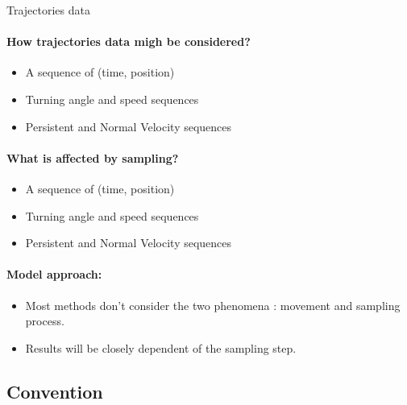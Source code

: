 \begin{frame}{Trajectories data}
\paragraph{How trajectories data migh be considered?}
\begin{itemize}
\item A sequence of (time, position)
\item Turning angle and speed sequences
\item Persistent and Normal Velocity sequences
\end{itemize}
\pause
\paragraph{What is affected by sampling?}
\begin{itemize}
\item A sequence of (time, position)
\item Turning angle and speed sequences
\item Persistent and Normal Velocity sequences
\end{itemize}
\pause
\paragraph{Model approach:}
\begin{itemize}
\item Most methods don't consider the two phenomena : movement and sampling process.
  \item Results will be closely dependent of the sampling step.
  \end{itemize}
\end{frame}

\subsection*{Convention}


